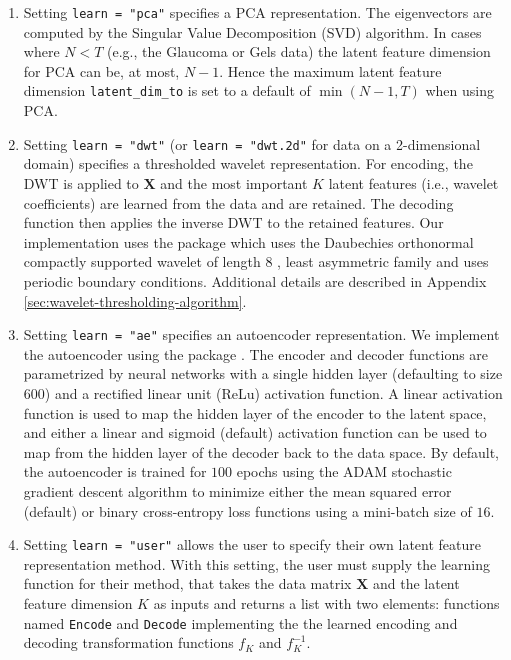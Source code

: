 \begin{enumerate}
    \item Setting \texttt{learn = "pca"} specifies a PCA representation. The eigenvectors are computed by the Singular Value Decomposition (SVD) algorithm. In cases where $N < T$ (e.g., the Glaucoma or Gels data) the latent feature dimension for PCA can be, at most, $N-1$. Hence the maximum latent feature dimension \texttt{latent\_dim\_to} is set to a default of $\min(N-1, T)$ when using PCA.
    \item Setting \texttt{learn = "dwt"} (or \texttt{learn = "dwt.2d"} for data on a 2-dimensional domain) specifies a thresholded wavelet representation. For encoding, the DWT is applied to $\mathbf{X}$ and the most important $K$ latent features (i.e., wavelet coefficients) are learned from the data and are retained. The decoding function then applies the inverse DWT to the retained features. Our implementation uses the   package \parencite{whitcher_waveslim_2024} which uses the Daubechies orthonormal compactly supported wavelet of length $8$ \parencite{daubechies_ten_1992}, least asymmetric family and uses periodic boundary conditions. Additional details are described in Appendix \ref{sec:wavelet-thresholding-algorithm}.
    \item Setting \texttt{learn = "ae"} specifies an autoencoder representation. We implement the autoencoder using the   package \parencite{kalinowski_keras_2024}. The encoder and decoder functions are parametrized by neural networks with a single hidden layer (defaulting to size $600$) and a rectified linear unit (ReLu) activation function.
    A linear activation function is used to map the hidden layer of the encoder to the latent space, and either a linear and sigmoid (default) activation function can be used to map from the hidden layer of the decoder back to the data space.
    By default, the autoencoder is trained for $100$ epochs using the ADAM stochastic gradient descent algorithm \parencite{kingma_adam_2017} to minimize either the mean squared error (default) or binary cross-entropy loss functions using a mini-batch size of $16$.
    \item Setting \texttt{learn = "user"} allows the user to specify their own latent feature representation method. With this setting, the user must supply the learning function for their method, that takes the data matrix $\mathbf{X}$ and the latent feature dimension $K$ as inputs and returns a list with two elements: functions named \texttt{Encode} and \texttt{Decode} implementing the the learned encoding and decoding transformation functions $f_K$ and $f_K^{-1}$. 
\end{enumerate}

